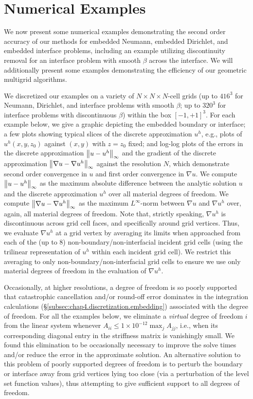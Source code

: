 \section{Numerical Examples} \label{sec:chap4.examples}

We now present some numerical examples demonstrating the second order accuracy of our methods for embedded Neumann, embedded Dirichlet, and embedded interface problems, including an example utilizing discontinuity removal for an interface problem with smooth $\beta$ across the interface. We will additionally present some examples demonstrating the efficiency of our geometric multigrid algorithms.

We discretized our examples on a variety of $N \times N \times N$-cell grids (up to $416^3$ for Neumann, Dirichlet, and interface problems with smooth $\beta$; up to $320^3$ for interface problems with discontinuous $\beta$) within the box $[-1,+1]^3$. For each example below, we give a graphic depicting the embedded boundary or interface; a few plots showing typical slices of the discrete approximation $u^h$, e.g., plots of $u^h(x,y,z_0)$ against $(x,y)$ with $z = z_0$ fixed; and log-log plots of the errors in the discrete approximation $\left\lVert u - u^h \right\rVert_{\infty}$ and the gradient of the discrete approximation $\left\lVert \nabla u - \nabla u^h \right\rVert_{\infty}$ against the resolution $N$, which demonstrate second order convergence in $u$ and first order convergence in $\nabla u$. We compute $\left\lVert u - u^h \right\rVert_{\infty}$ as the maximum absolute difference between the analytic solution $u$ and the discrete approximation $u^h$ over all material degrees of freedom. We compute $\left\lVert \nabla u - \nabla u^h \right\rVert_{\infty}$ as the maximum $L^{\infty}$-norm between $\nabla u$ and $\nabla u^h$ over, again, all material degrees of freedom. Note that, strictly speaking, $\nabla u^h$ is discontinuous across grid cell faces, and specifically around grid vertices. Thus, we evaluate $\nabla u^h$ at a grid vertex by averaging its limits when approached from each of the (up to $8$) non-boundary/non-interfacial incident grid cells (using the trilinear representation of $u^h$ within each incident grid cell). We restrict this averaging to only non-boundary/non-interfacial grid cells to ensure we use only material degrees of freedom in the evaluation of $\nabla u^h$.

Occasionally, at higher resolutions, a degree of freedom is so poorly supported that catastrophic cancellation and/or round-off error dominates in the integration calculations (\S\ref{subsec:chap4.discretization.embedding}) associated with the degree of freedom. For all the examples below, we eliminate a \emph{virtual} degree of freedom $i$ from the linear system whenever $A_{ii} \leq 1 \times 10^{-12} \max_j A_{jj}$, i.e., when its corresponding diagonal entry in the striffness matrix is vanishingly small. We found this elimination to be occasionally necessary to improve the solve times and/or reduce the error in the approximate solution. An alternative solution to this problem of poorly supported degrees of freedom is to perturb the boundary or interface away from grid vertices lying too close (via a perturbation of the level set function values), thus attempting to give sufficient support to all degrees of freedom.

